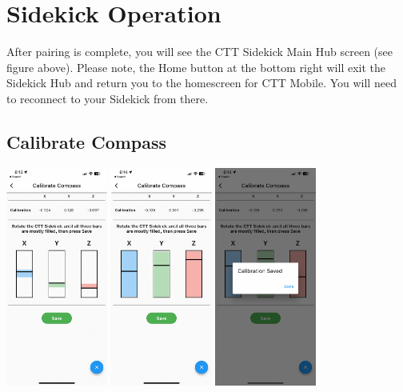 \documentclass[
]{article}
\begin{document}
\hypertarget{sidekick-operation}{%
\section{Sidekick Operation}\label{sidekick-operation}}

After pairing is complete, you will see the CTT Sidekick Main Hub screen
(see figure above). Please note, the Home button at the bottom right
will exit the Sidekick Hub and return you to the homescreen for CTT
Mobile. You will need to reconnect to your Sidekick from there.

\hypertarget{calibrate-compass}{%
\subsection{Calibrate Compass}\label{calibrate-compass}}

\includegraphics[width=0.25\textwidth,height=\textheight]{./images/sidekick_compassCalib1.PNG}
\includegraphics[width=0.25\textwidth,height=\textheight]{./images/sidekick_compassCalib2.PNG}
\includegraphics[width=0.25\textwidth,height=\textheight]{./images/sidekick_calibrationSaved.PNG}
\end{document}
